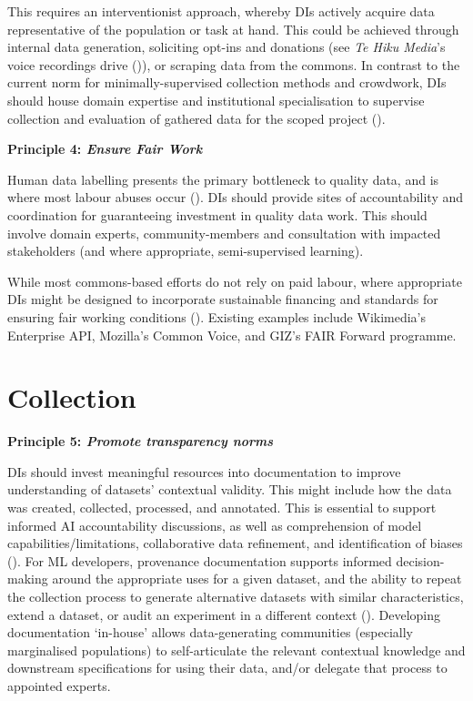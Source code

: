This requires an interventionist approach, whereby DIs actively acquire data representative of the population or task at hand. This could be achieved through internal data generation, soliciting opt-ins and donations (see \textit{Te Hiku Media}’s voice recordings drive (\cite{nastMaoriAreTrying})), or scraping data from the commons. In contrast to the current norm for minimally-supervised collection methods and crowdwork, DIs should house domain expertise and institutional specialisation to supervise collection and evaluation of gathered data for the scoped project (\cite{jo2020LessonsArchivesStrategies}). 

\textbf{Principle 4: \textit{Ensure Fair Work}}

Human data labelling presents the primary bottleneck to quality data, and is where most labour abuses occur (\cite{miceli2020SubjectivityImpositionPower}). DIs should provide sites of accountability and coordination for guaranteeing investment in quality data work. This should involve domain experts, community-members and consultation with impacted stakeholders (and where appropriate, semi-supervised learning). 

While most commons-based efforts do not rely on paid labour, where appropriate DIs might be designed to incorporate sustainable financing and standards for ensuring fair working conditions (\cite{commons-based_data_set_governance_for_ai}). Existing examples include Wikimedia’s Enterprise API, Mozilla's Common Voice, and GIZ’s FAIR Forward programme.

\section*{Collection}

\textbf{Principle 5: \textit{Promote transparency norms}}

DIs should invest meaningful resources into documentation to improve understanding of datasets’ contextual validity. This might include how the data was created, collected, processed, and annotated. This is essential to support informed AI accountability discussions, as well as comprehension of model capabilities/limitations, collaborative data refinement, and identification of biases (\cite{bommasani2024FoundationModelTransparency}). For ML developers, provenance documentation supports informed decision-making around the appropriate uses for a given dataset, and the ability to repeat the collection process to generate alternative datasets with similar characteristics, extend a dataset, or audit an experiment in a different context (\cite{paullada2021DataItsDis, jo2020LessonsArchivesStrategies}). Developing documentation `in-house’ allows data-generating communities (especially marginalised populations) to self-articulate the relevant contextual knowledge and downstream specifications for using their data, and/or delegate that process to appointed experts.

